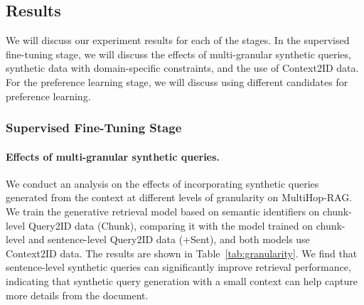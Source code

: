 \begin{table}[t]
    \centering
    \small
    \caption{Ablation study on the effect of synthetic queries generated at a sentence-level granularity of context on Multihop-RAG.}
    \label{tab:granularity}
    \vspace{-0.8em}
\end{table}


\subsection{Results}
We will discuss our experiment results for each of the stages. In the supervised fine-tuning stage, we will discuss the effects of multi-granular synthetic queries, synthetic data with domain-specific constraints, and the use of Context2ID data. For the preference learning stage, we will discuss using different candidates for preference learning.

\subsubsection{Supervised Fine-Tuning Stage}

\paragraph{Effects of multi-granular synthetic queries.} We conduct an analysis on the effects of incorporating synthetic queries generated from the context at different levels of granularity on MultiHop-RAG. We train the generative retrieval model based on semantic identifiers on chunk-level Query2ID data (Chunk), comparing it with the model trained on chunk-level and sentence-level Query2ID data (+Sent), and both models use Context2ID data.
The results are shown in Table~\ref{tab:granularity}. We find that sentence-level synthetic queries can significantly improve retrieval performance, indicating that synthetic query generation with a small context can help capture more details from the document.

